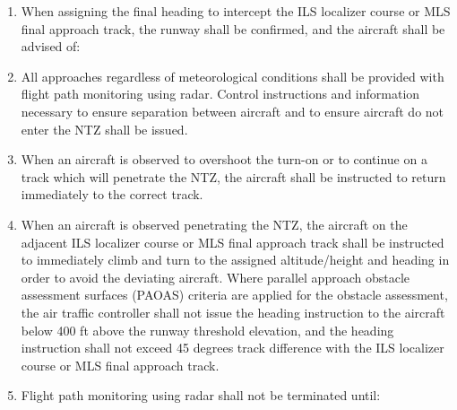 \documentclass[../vATM.tex]{subfiles}
\begin{document}
\begin{enumeratesc}
\begin{enumerate}
            \item When assigning the final heading to intercept the ILS localizer course or MLS final approach track, the runway shall be confirmed, and the aircraft shall be advised of:


            \item All approaches regardless of meteorological conditions shall be provided with flight path monitoring using radar. Control instructions and information necessary to ensure separation between aircraft and to ensure aircraft do not enter the NTZ shall be issued.
            \item When an aircraft is observed to overshoot the turn-on or to continue on a track which will penetrate the NTZ, the aircraft shall be instructed to return immediately to the correct track.
            \item When an aircraft is observed penetrating the NTZ, the aircraft on the adjacent ILS localizer course or MLS final approach track shall be instructed to immediately climb and turn to the assigned altitude/height and heading in order to avoid the deviating aircraft. Where parallel approach obstacle assessment surfaces (PAOAS) criteria are applied for the obstacle assessment, the air traffic controller shall not issue the heading instruction to the aircraft below 400 ft above the runway threshold elevation, and the heading instruction shall not exceed 45 degrees track difference with the ILS localizer course or MLS final approach track.
            \item Flight path monitoring using radar shall not be terminated until:


\end{enumerate}
\end{enumeratesc}
\end{document}
